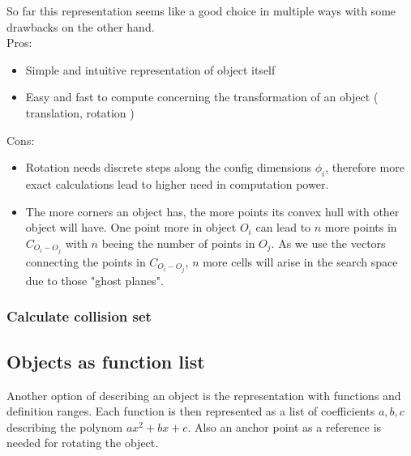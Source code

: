 So far this representation seems like a good choice in multiple ways with some drawbacks on the other hand.\\
Pros:
\begin{itemize}
\item Simple and intuitive representation of object itself
\item Easy and fast to compute concerning the transformation of an object ( translation, rotation )
\end{itemize}
Cons:\\
\begin{itemize}
\item Rotation needs discrete steps along the config dimensions $\phi_i$, therefore more exact calculations lead to higher need in computation power.
\item The more corners an object has, the more points its convex hull with other object will have. One point more in object $O_i$ can lead to $n$ more points in $C_{O_i-O_j}$ with $n$ beeing the number of points in $O_j$. As we use the vectors connecting the points in $C_{O_i-O_j}$, $n$ more cells will arise in the search space due to those "ghost planes".
\end{itemize}


\subsubsection{Calculate collision set}

\subsection{Objects as function list}
\label{subsec:functionlist}
Another option of describing an object is the representation with functions and definition ranges. Each function is then represented as a list of coefficients $a,b,c$ describing the polynom $ax^2 + bx + c$. Also an anchor point as a reference is needed for rotating the object.\\

